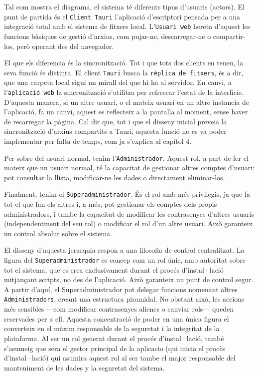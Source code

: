 Tal com mostra el diagrama, el sistema té diferents tipus d'usuaris (actors). El punt de partida és el \texttt{Client Tauri} l'aplicació d'escriptori pensada per a una integració total amb el sistema de fitxers local. L'\texttt{Usuari web} hereta d'aquest les funcions bàsiques de gestió d'arxius, com pujar-ne, descarregar-ne o compartir-los, però operant des del navegador. 

El que els diferencia és la sincronització. Tot i que tots dos clients en tenen, la seva funció és distinta. El client \texttt{Tauri} busca la \texttt{rèplica de fitxers}, és a dir, que una carpeta local sigui un mirall del que hi ha al servidor. En canvi, a l'\texttt{aplicació web} la sincronització s'utilitza per refrescar l'estat de la interfície. D'aquesta manera, si un altre usuari, o el mateix usuari en un altre instancia de l'aplicació, fa un canvi, aquest es reflecteix a la pantalla al moment, sense haver de recarregar la pàgina. Cal dir que, tot i que el disseny inicial preveia la sincronització d'arxius compartits a Tauri, aquesta funció no es va poder implementar per falta de temps, com ja s'explica al capítol 4.

Per sobre del usuari normal, tenim l'\texttt{Administrador}. Aquest rol, a part de fer el mateix que un usuari normal, té la capacitat de gestionar altres comptes d'usuari: pot consultar la llista, modificar-ne les dades o directament eliminar-los.

Finalment, tenim el \texttt{Superadministrador}. És el rol amb més privilegis, ja que fa tot el que fan els altres i, a més, pot gestionar els comptes dels propis administradors, i tambe la capacitat de modificar les contrasenyes d'altres usuaris (independentment del seu rol) o modificar el rol d'un altre usuari. Això garanteix un control absolut sobre el sistema.

El disseny d'aquesta jerarquia respon a una filosofia de control centralitzat. La figura del \texttt{Superadministrador} es concep com un rol únic, amb autoritat sobre tot el sistema, que es crea exclusivament durant el procés d'instal·lació mitjançant scripts, no des de l'aplicació. Això garanteix un punt de control segur. A partir d'aquí, el Superadministrador pot delegar funcions nomenant altres \texttt{Administradors}, creant una estructura piramidal. No obstant això, les accions més sensibles —com modificar contrasenyes alienes o canviar rols— queden reservades per a ell. Aquesta concentració de poder en una única figura el converteix en el màxim responsable de la seguretat i la integritat de la plataforma. Al ser un rol generat durant el procés d'instal·lació, també s'asumeig que sera el gestor principal de la aplicacio (qui inicia el procès d'instal·lació) qui asumira aquest rol al ser tambe el major responsable del manteniment de les dades y la seguretat del sistema.

